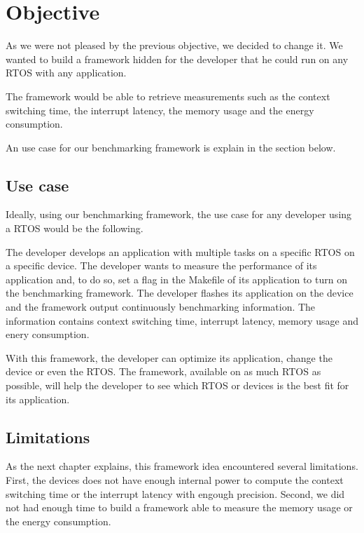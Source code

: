 \section{Objective}

As we were not pleased by the previous objective, we decided to change it.
We wanted to build a framework hidden for the developer that he could run on any RTOS with any application.

The framework would be able to retrieve measurements such as the context switching time, the interrupt latency, the memory usage and the energy consumption.

An use case for our benchmarking framework is explain in the section below.

\subsection{Use case}
Ideally, using our benchmarking framework, the use case for any developer using a RTOS would be the following.

The developer develops an application with multiple tasks on a specific RTOS on a specific device.
The developer wants to measure the performance of its application and, to do so, set a flag in the Makefile of its application to turn on the benchmarking framework.
The developer flashes its application on the device and the framework output continuously benchmarking information.
The information contains context switching time, interrupt latency, memory usage and enery consumption.

With this framework, the developer can optimize its application, change the device or even the RTOS.
The framework, available on as much RTOS as possible, will help the developer to see which RTOS or devices is the best fit for its application.

\subsection{Limitations}
As the next chapter explains, this framework idea encountered several limitations.
First, the devices does not have enough internal power to compute the context switching time or the interrupt latency with engough precision.
Second, we did not had enough time to build a framework able to measure the memory usage or the energy consumption.